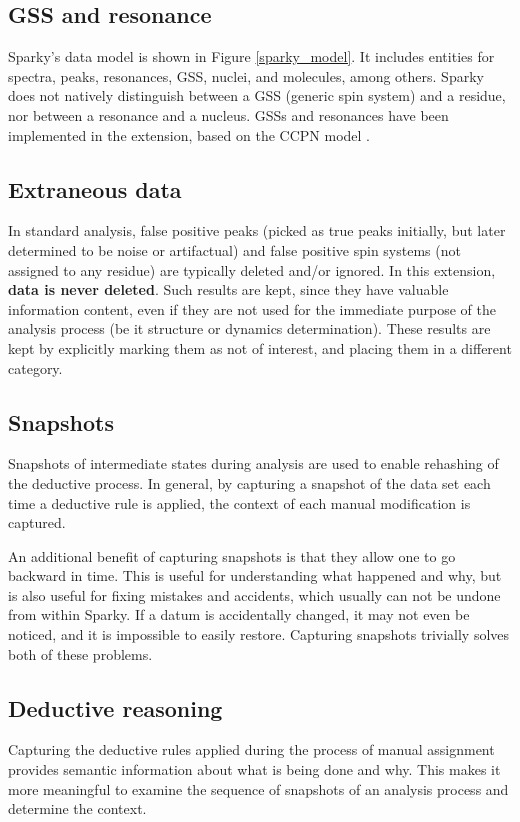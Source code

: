\subsection*{GSS and resonance}
Sparky's data model is shown in Figure \ref{sparky_model}.  It includes 
entities for spectra, peaks, resonances, GSS, nuclei, and molecules, among
others.  Sparky does not natively distinguish between a GSS (generic spin 
system) and a residue, nor between a resonance and a nucleus.
GSSs and resonances have been implemented in the extension, based 
on the CCPN model \cite{ccpn}.

\subsection*{Extraneous data}
In standard analysis, false positive peaks (picked as true peaks initially,
but later determined to be noise or artifactual) and false positive spin 
systems (not assigned to any residue) are typically deleted and/or ignored.
In this extension, \textbf{data is never deleted}.  Such results are kept,
since they have valuable information content, even if they are not used for
the immediate purpose of the analysis process (be it structure or dynamics
determination).  These results are kept by explicitly marking them as not of 
interest, and placing them in a different category.

\subsection*{Snapshots}
Snapshots of intermediate states during analysis are used to enable rehashing
of the deductive process.  In general, by capturing a snapshot of the data set
each time a deductive rule is applied, the context of each manual modification
is captured.

An additional benefit of capturing snapshots is that they allow one to go 
backward in time.  This is useful for understanding what happened and
why, but is also useful for fixing mistakes and accidents, which usually 
can not be undone from within Sparky.
If a datum is accidentally changed, it may not even be noticed, and it is 
impossible to easily restore.  Capturing snapshots trivially solves both
of these problems.

\subsection*{Deductive reasoning}
Capturing the deductive rules applied during the process of manual assignment
provides semantic information about what is being done and why.  This makes it
more meaningful to examine the sequence of snapshots of an analysis
process and determine the context.



